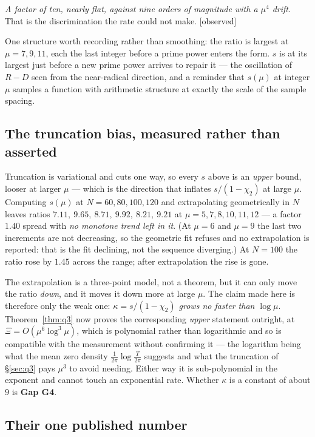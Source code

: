 \documentclass[11pt,a4paper]{article}
\theoremstyle{plain}
\theoremstyle{definition}
\theoremstyle{remark}
\newcommand{\st}[1]{{\normalfont\sffamily\footnotesize[#1]}}
\newcommand{\observed}{\st{observed}}
\begin{document}
\emph{A factor of ten, nearly flat, against nine orders of magnitude with a
$\mu^4$ drift.}  That is the discrimination the rate could not make. \observed

One structure worth recording rather than smoothing: the ratio is largest at
$\mu=7,9,11$, each the last integer before a prime power enters the form.  $s$
is at its largest just before a new prime power arrives to repair it --- the
oscillation of $R-D$ seen from the near-radical direction, and a reminder that
$s(\mu)$ at integer $\mu$ samples a function with arithmetic structure at exactly
the scale of the sample spacing.

\subsection{The truncation bias, measured rather than asserted}
\label{sec:truncbias}

Truncation is variational and cuts one way, so every $s$ above is an
\emph{upper} bound, looser at larger $\mu$ --- which is the direction that
inflates $s/(1-\chi_2)$ at large $\mu$.  Computing $s(\mu)$ at $N=60,80,100,120$
and extrapolating geometrically in $N$ leaves ratios
$7.11,\ 9.65,\ 8.71,\ 9.92,\ 8.21,\ 9.21$ at $\mu=5,7,8,10,11,12$ --- a factor
$1.40$ spread with \emph{no monotone trend left in it}.  (At $\mu=6$ and $\mu=9$
the last two increments are not decreasing, so the geometric fit refuses and no
extrapolation is reported: that is the fit declining, not the sequence
diverging.)  At $N=100$ the ratio rose by $1.45$ across the range; after
extrapolation the rise is gone.

The extrapolation is a three-point model, not a theorem, but it can only move
the ratio \emph{down}, and it moves it down more at large $\mu$.  The claim made
here is therefore only the weak one: \emph{$\kappa=s/(1-\chi_2)$ grows no faster
than $\log\mu$}.  Theorem~\ref{thm:q3} now proves the corresponding
\emph{upper} statement outright, at $\Xi=O(\mu^6\log^3\!\mu)$, which is
polynomial rather than logarithmic and so is compatible with the measurement
without confirming it --- the logarithm being what the mean zero density
$\frac1{2\pi}\log\frac{T}{2\pi}$ suggests and what the truncation of
\S\ref{sec:q3} pays $\mu^3$ to avoid needing.  Either
way it is sub-polynomial in the exponent and cannot touch an exponential rate.  Whether $\kappa$
is a constant of about $9$ is \textbf{Gap G4}.

\subsection{Their one published number}
\label{sec:theirnumber}
\end{document}
